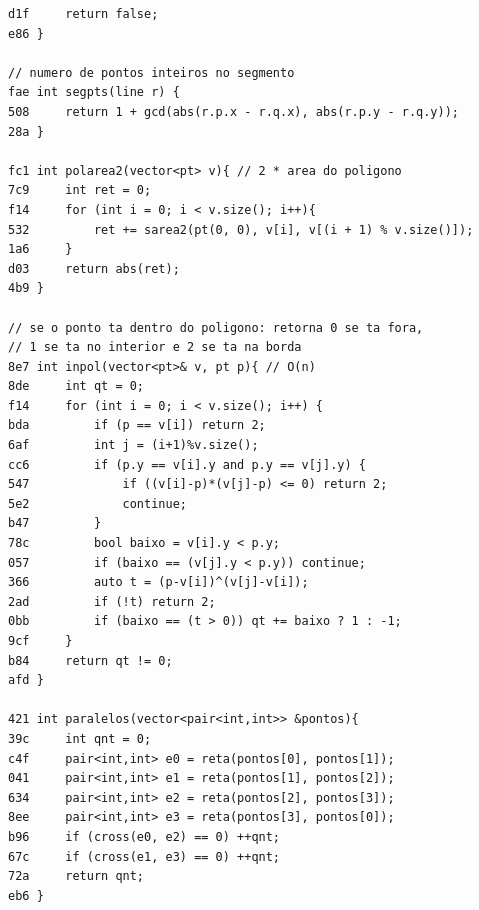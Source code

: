 \documentclass[11pt, a4paper, twoside]{article}
\begin{document}
\begin{lstlisting}
d1f     return false;
e86 }

// numero de pontos inteiros no segmento
fae int segpts(line r) { 
508 	return 1 + gcd(abs(r.p.x - r.q.x), abs(r.p.y - r.q.y));
28a }

fc1 int polarea2(vector<pt> v){ // 2 * area do poligono
7c9 	int ret = 0;
f14 	for (int i = 0; i < v.size(); i++){
532 		ret += sarea2(pt(0, 0), v[i], v[(i + 1) % v.size()]);
1a6     }
d03     return abs(ret);
4b9 }

// se o ponto ta dentro do poligono: retorna 0 se ta fora,
// 1 se ta no interior e 2 se ta na borda
8e7 int inpol(vector<pt>& v, pt p){ // O(n)
8de 	int qt = 0;
f14 	for (int i = 0; i < v.size(); i++) {
bda 		if (p == v[i]) return 2;
6af 		int j = (i+1)%v.size();
cc6 		if (p.y == v[i].y and p.y == v[j].y) {
547 			if ((v[i]-p)*(v[j]-p) <= 0) return 2;
5e2 			continue;
b47 		}
78c 		bool baixo = v[i].y < p.y;
057 		if (baixo == (v[j].y < p.y)) continue;
366 		auto t = (p-v[i])^(v[j]-v[i]);
2ad 		if (!t) return 2;
0bb 		if (baixo == (t > 0)) qt += baixo ? 1 : -1;
9cf 	}
b84 	return qt != 0;
afd }

421 int paralelos(vector<pair<int,int>> &pontos){
39c     int qnt = 0;
c4f     pair<int,int> e0 = reta(pontos[0], pontos[1]);
041     pair<int,int> e1 = reta(pontos[1], pontos[2]);
634     pair<int,int> e2 = reta(pontos[2], pontos[3]);
8ee     pair<int,int> e3 = reta(pontos[3], pontos[0]);
b96     if (cross(e0, e2) == 0) ++qnt;
67c     if (cross(e1, e3) == 0) ++qnt;
72a     return qnt;
eb6 }
 
\end{lstlisting}
\end{document}

